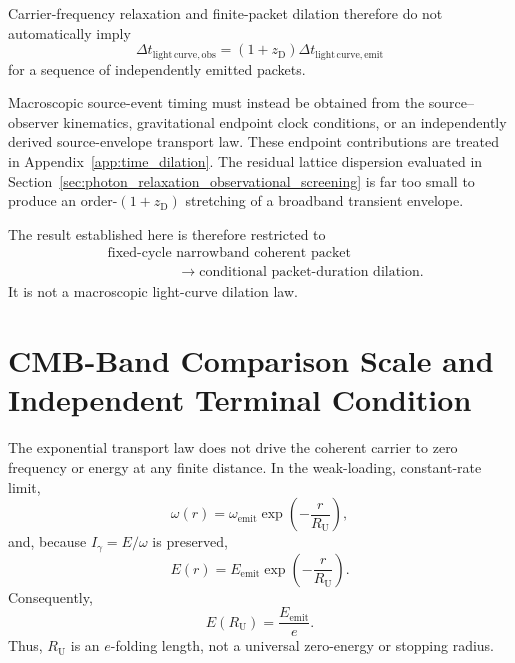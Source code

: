 Carrier-frequency relaxation and finite-packet dilation therefore do not
automatically imply
\begin{equation}
    \Delta t_{\mathrm{light\,curve,obs}}
    =
    \left(
        1+z_{\mathrm D}
    \right)
    \Delta t_{\mathrm{light\,curve,emit}}
    \label{eq:photon_relaxation_macroscopic_dilation_target}
\end{equation}
for a sequence of independently emitted packets.

Macroscopic source-event timing must instead be obtained from the
source--observer kinematics, gravitational endpoint clock conditions, or an
independently derived source-envelope transport law. These endpoint
contributions are treated in Appendix~\ref{app:time_dilation}. The residual
lattice dispersion evaluated in
Section~\ref{sec:photon_relaxation_observational_screening} is far too small
to produce an order-\((1+z_{\mathrm D})\) stretching of a broadband transient
envelope.

The result established here is therefore restricted to
\begin{equation}
    \begin{aligned}
        &\text{fixed-cycle narrowband coherent packet}
        \\
        &\hspace{5em}
        \longrightarrow
        \text{conditional packet-duration dilation}.
    \end{aligned}
    \label{eq:photon_relaxation_packet_dilation_scope_result}
\end{equation}
It is not a macroscopic light-curve dilation law.


\section{CMB-Band Comparison Scale and Independent Terminal Condition}
\label{sec:photon_relaxation_cmb_assimilation}

The exponential transport law does not drive the coherent carrier to zero
frequency or energy at any finite distance. In the weak-loading,
constant-rate limit,
\begin{equation}
    \omega(r)
    =
    \omega_{\mathrm{emit}}
    \exp
    \left(
        -
        \frac{r}{R_{\mathrm U}}
    \right),
    \label{eq:photon_relaxation_frequency_distance_law}
\end{equation}
and, because
\(I_{\gamma}=E/\omega\)
is preserved,
\begin{equation}
    E(r)
    =
    E_{\mathrm{emit}}
    \exp
    \left(
        -
        \frac{r}{R_{\mathrm U}}
    \right).
    \label{eq:photon_relaxation_energy_distance_law}
\end{equation}
Consequently,
\begin{equation}
    E(R_{\mathrm U})
    =
    \frac{
        E_{\mathrm{emit}}
    }{
        e
    }.
    \label{eq:photon_relaxation_one_efold_energy}
\end{equation}
Thus, \(R_{\mathrm U}\) is an \(e\)-folding length, not a universal
zero-energy or stopping radius.

